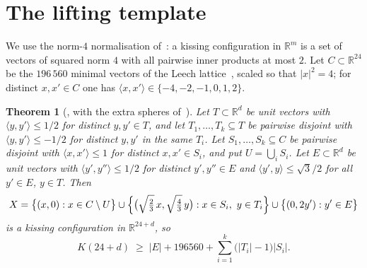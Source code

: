 \documentclass[11pt,reqno]{amsart}
\theoremstyle{plain}
\newtheorem{theorem}{Theorem}
\theoremstyle{remark}
\newcommand{\R}{\mathbb{R}}
\newcommand{\ip}[2]{\langle #1, #2\rangle}
\begin{document}
\section{The lifting template}\label{sec:template}

We use the norm-$4$ normalisation of~\cite{CJKT2011,KKW2017}: a kissing
configuration in $\R^{m}$ is a set of vectors of squared norm $4$ with all
pairwise inner products at most $2$.  Let $C \subset \R^{24}$ be the $196\,560$
minimal vectors of the Leech lattice~\cite{Leech1967,SPLAG}, scaled so that
$|x|^{2} = 4$; for distinct $x,x' \in C$ one has
$\ip{x}{x'} \in \{-4,-2,-1,0,1,2\}$.

\begin{theorem}[{\cite[Thm.~7.5]{CJKT2011}}, with the extra spheres
of~\cite{Ma2025}]\label{thm:template}
Let $T \subset \R^{d}$ be unit vectors with $\ip{y}{y'} \le 1/2$ for distinct
$y,y' \in T$, and let $T_{1},\dots,T_{k} \subseteq T$ be pairwise disjoint with
$\ip{y}{y'} \le -1/2$ for distinct $y,y'$ in the same $T_{i}$.  Let
$S_{1},\dots,S_{k} \subseteq C$ be pairwise disjoint with $\ip{x}{x'} \le 1$ for
distinct $x,x' \in S_{i}$, and put $U = \bigcup_{i} S_{i}$.  Let
$E \subset \R^{d}$ be unit vectors with $\ip{y'}{y''} \le 1/2$ for distinct
$y',y'' \in E$ and $\ip{y'}{y} \le \sqrt3/2$ for all $y' \in E$, $y \in T$.  Then
\[
  X = \bigl\{(x,0) : x \in C \setminus U\bigr\}
   \cup
   \Bigl\{\bigl(\sqrt{\tfrac{2}{3}}\,x, \sqrt{\tfrac{4}{3}}\,y\bigr)
          : x \in S_{i},\ y \in T_{i}\Bigr\}
   \cup
   \bigl\{(0,2y') : y' \in E\bigr\}
\]
is a kissing configuration in $\R^{24+d}$, so
\begin{equation}\label{eq:count}
  K(24+d) \;\ge\; |E| + 196560 + \sum_{i=1}^{k}\bigl(|T_{i}|-1\bigr)|S_{i}|.
\end{equation}
\end{theorem}
\end{document}
